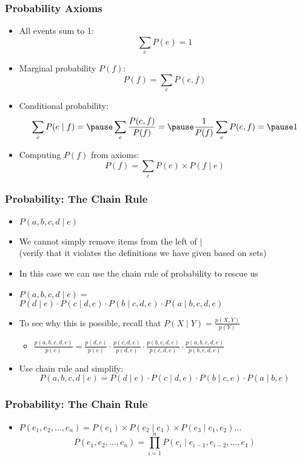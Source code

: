\documentclass[handout]{beamer}
\begin{document}
\begin{frame}
\frametitle{Probability Axioms}
\begin{itemize}[<+->]
\item All events sum to 1: \[ \sum_e P(e) = 1 \]
\item Marginal probability $P(f)$: \[ P(f) = \sum_e P(e, f)  \]
\item Conditional probability: \[ \sum_e P(e \mid f) = \pause \sum_e \frac{P(e,f)}{P(f)} = \pause \frac{1}{P(f)} \sum_e P(e,f) = \pause 1 \]
\item Computing $P(f)$ from axioms: \[ P(f) = \sum_e P(e) \times
  P(f \mid e) \]
\end{itemize}

\end{frame}

\begin{frame}
\frametitle{Probability: The Chain Rule}
\begin{itemize}[<+->]
\item $P(a,b,c,d \mid e)$
\item We cannot simply remove items from the left of $\mid$ \\
(verify that it violates the definitions we have given based on sets)
\item In this case we can use the chain rule of probability to rescue
  us
\item $P(a,b,c,d \mid e) = $\\
$P(d \mid e) \cdot P(c \mid d,e) \cdot P(b \mid c,d,e) \cdot P(a \mid b,c,d,e)$ 
\item To see why this is possible, recall that \( P(X \mid Y) = \frac{p(X,Y)}{p(Y)} \)
\begin{itemize}
\item $\frac{ p(a,b,c,d,e) }{ p(e) } = \frac{p(d,e)}{p(e)} \cdot \frac{p(c,d,e)}{p(d,e)} \cdot \frac{p(b,c,d,e)}{p(c,d,e)} \cdot \frac{p(a,b,c,d,e)}{p(b,c,d,e)} $
\end{itemize}
\item Use chain rule and simplify:
\[ P(a,b,c,d \mid e) = P(d \mid e) \cdot P(c \mid d, e) \cdot P(b \mid c, e) \cdot P(a \mid b, e) \]
\end{itemize}

\end{frame}

\begin{frame}
\frametitle{Probability: The Chain Rule}
\begin{itemize}[<+->]
\item $P(e_1, e_2, \ldots, e_n) = P(e_1) \times P(e_2 \mid
  e_1) \times P(e_3 \mid e_1, e_2) \ldots $ 
\[ P(e_1, e_2, \ldots, e_n) = \prod^n_{i=1} P(e_i \mid e_{i-1},
  e_{i-2}, \ldots, e_1) \]
\end{itemize}

\end{frame}
\end{document}
